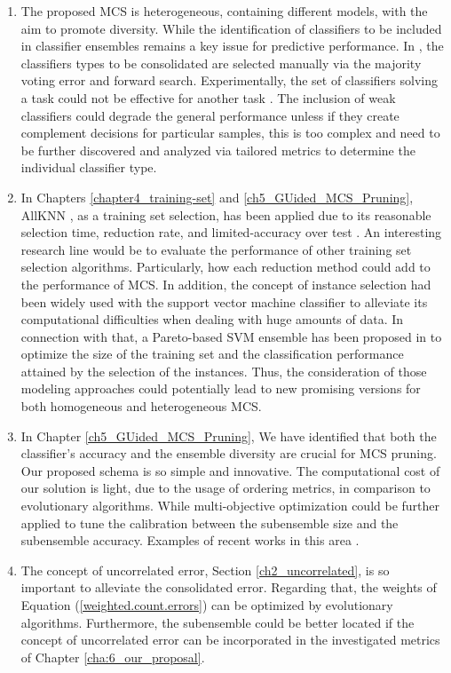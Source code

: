 \begin{enumerate}
     \item The proposed MCS is heterogeneous, containing different models, with the aim to promote diversity. While the identification of classifiers to be included in classifier ensembles remains a key issue for predictive performance. In \cite{onan2016}, the classifiers types to be consolidated are selected manually via the majority voting error and forward search. Experimentally, the set of classifiers solving a task could not be effective for another task \citep{wolpert2002}. The inclusion of weak classifiers could degrade the general performance unless if they create complement decisions for particular samples, this is too complex and need to be further discovered and analyzed via tailored metrics to determine the individual classifier type. 
    \item In Chapters \ref{chapter4_training-set} and \ref{ch5_GUided_MCS_Pruning}, AllKNN \cite{tomek1976}, as a training set selection, has been applied due to its reasonable selection time, reduction rate, and limited-accuracy over test \cite{garcia2011}. An interesting research line would be to evaluate the performance of other training set selection algorithms. Particularly, how each reduction method could add to the performance of MCS. In addition, the concept of instance selection had been widely used with the support vector machine classifier \cite{liu2017,chen2013} to alleviate its computational difficulties when dealing with huge amounts of data. In connection with that, a Pareto-based SVM ensemble has been proposed in \cite{rosales2017} to optimize the size of the training set and the classification performance attained by the selection of the instances. Thus, the consideration of those modeling approaches could potentially lead to new promising versions for both homogeneous and heterogeneous MCS.      
    
    \item In Chapter \ref{ch5_GUided_MCS_Pruning}, We have identified that both the classifier's accuracy and the ensemble diversity are crucial for MCS pruning. Our proposed schema is so simple and innovative. The computational cost of our solution is light, due to the usage of ordering metrics, in comparison to evolutionary algorithms. While multi-objective optimization could be further applied to tune the calibration between the subensemble size and the subensemble accuracy. Examples of recent works in this area \cite{fletcher2020}.
    
    \item The concept of uncorrelated error, Section \ref{ch2_uncorrelated}, is so important to alleviate the consolidated error. Regarding that, the weights of Equation (\ref{weighted.count.errors}) can be optimized by evolutionary algorithms. Furthermore, the subensemble could be better located if the concept of uncorrelated error can be incorporated in the investigated metrics of Chapter \ref{cha:6_our_proposal}.
    

\end{enumerate}
